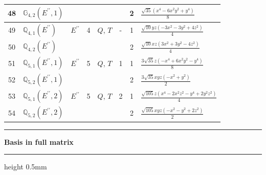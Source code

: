 \documentclass[fleqn,10pt,landscape]{jsarticle}
\begin{document}
\begin{longtable}[l]{clcccccl}
48 & $\mathbb{G}_{4,2}(E^{\prime\prime},1)$ &  &  &  &  & 2 & $\frac{\sqrt{35} \left(x^{4} - 6 x^{2} y^{2} + y^{4}\right)}{8}$ \\ \hline
49 & $\mathbb{Q}_{4,1}(E^{\prime\prime})$ & $E^{\prime\prime}$ & 4 & $Q$, $T$ & - & 1 & $\frac{\sqrt{10} y z \left(- 3 x^{2} - 3 y^{2} + 4 z^{2}\right)}{4}$ \\
50 & $\mathbb{Q}_{4,2}(E^{\prime\prime})$ &  &  &  &  & 2 & $\frac{\sqrt{10} x z \left(3 x^{2} + 3 y^{2} - 4 z^{2}\right)}{4}$ \\ \hline
51 & $\mathbb{Q}_{5,1}(E^{\prime\prime},1)$ & $E^{\prime\prime}$ & 5 & $Q$, $T$ & 1 & 1 & $\frac{3 \sqrt{35} z \left(- x^{4} + 6 x^{2} y^{2} - y^{4}\right)}{8}$ \\
52 & $\mathbb{Q}_{5,2}(E^{\prime\prime},1)$ &  &  &  &  & 2 & $\frac{3 \sqrt{35} x y z \left(- x^{2} + y^{2}\right)}{2}$ \\ \hline
53 & $\mathbb{Q}_{5,1}(E^{\prime\prime},2)$ & $E^{\prime\prime}$ & 5 & $Q$, $T$ & 2 & 1 & $\frac{\sqrt{105} z \left(x^{4} - 2 x^{2} z^{2} - y^{4} + 2 y^{2} z^{2}\right)}{4}$ \\
54 & $\mathbb{Q}_{5,2}(E^{\prime\prime},2)$ &  &  &  &  & 2 & $\frac{\sqrt{105} x y z \left(- x^{2} - y^{2} + 2 z^{2}\right)}{2}$ \\
\end{longtable}
\vspace{5mm}
\noindent \rule[0.5mm]{5mm}{0.5mm}\hspace{3mm}\textbf{Basis in full matrix}\hspace{3mm}\leaders\hrule height 0.5mm\hfill\kern0pt
\vspace{3mm}
\end{document}
